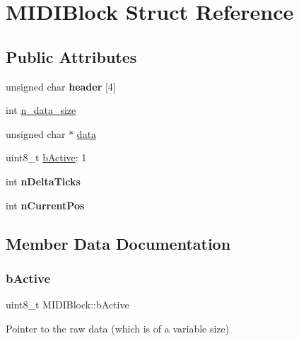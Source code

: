\hypertarget{structMIDIBlock}{}\section{M\+I\+D\+I\+Block Struct Reference}
\label{structMIDIBlock}
\subsection*{Public Attributes}
\begin{DoxyCompactItemize}
\item 
\mbox{\label{structMIDIBlock_a02e4e52dba7225c6f89d42dc15446793}} 
unsigned char {\bfseries header} \mbox{[}4\mbox{]}
\item 
int \hyperlink{structMIDIBlock_a20638ff9789b0deb8ece121078066931}{n\+\_\+data\+\_\+size}
\item 
unsigned char $\ast$ \hyperlink{structMIDIBlock_a69c7c7dbb87cd8eb4e2821ccc1aef4fb}{data}
\item 
uint8\+\_\+t \hyperlink{structMIDIBlock_a5df2dee4c1fffdf42975605a07680c84}{b\+Active}\+: 1
\item 
\mbox{\label{structMIDIBlock_ac9e4e48fe46810eb7f1ab3ede1cd8ca5}} 
int {\bfseries n\+Delta\+Ticks}
\item 
\mbox{\label{structMIDIBlock_accc0768255ba9970f96853f90136f745}} 
int {\bfseries n\+Current\+Pos}
\end{DoxyCompactItemize}


\subsection{Member Data Documentation}
\mbox{\label{structMIDIBlock_a5df2dee4c1fffdf42975605a07680c84}} 
\subsubsection{\texorpdfstring{b\+Active}{bActive}}
{\footnotesize\ttfamily uint8\+\_\+t M\+I\+D\+I\+Block\+::b\+Active}

Pointer to the raw data (which is of a variable size) \mbox{\label{structMIDIBlock_a69c7c7dbb87cd8eb4e2821ccc1aef4fb}} 
